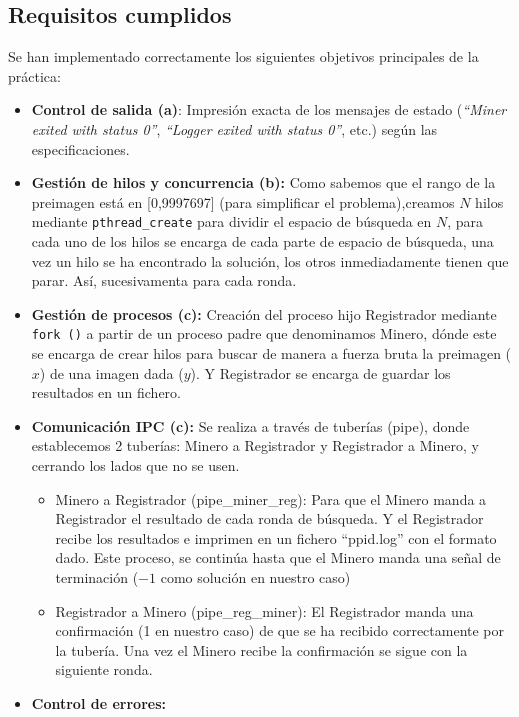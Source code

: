 \documentclass[12pt,a4paper]{article}
\begin{document}
\subsection{Requisitos cumplidos}
Se han implementado correctamente los siguientes objetivos principales de la práctica:
\begin{itemize}
    \item \textbf{Control de salida (a)}: Impresión exacta de los mensajes de estado (\textit{``Miner exited with status 0''}, \textit{``Logger exited with status 0''}, etc.) según las especificaciones.
    \item \textbf{Gestión de hilos y concurrencia (b):} Como sabemos que el rango de la preimagen está en [0,9997697] (para simplificar el problema),creamos $N$ hilos mediante \texttt{pthread\_create} para dividir el espacio de búsqueda en $N$, para cada uno de los hilos se encarga de cada parte de espacio de búsqueda, una vez un hilo se ha encontrado la solución, los otros inmediadamente tienen que parar. Así, sucesivamenta para cada ronda.
    \item \textbf{Gestión de procesos (c):} Creación del proceso hijo Registrador mediante \texttt{fork ()} a partir de un proceso padre que denominamos Minero, dónde este se encarga de crear hilos para buscar de manera a fuerza bruta la preimagen ($x$) de una imagen dada ($y$). Y Registrador se encarga de guardar los resultados en un fichero.
    \item \textbf{Comunicación IPC (c):} Se realiza a través de tuberías (pipe), donde establecemos 2 tuberías: Minero a Registrador y Registrador a Minero, y cerrando los lados que no se usen.
    \begin{itemize} 
        \item Minero a Registrador (pipe\_miner\_reg): Para que el Minero manda a Registrador el resultado de cada ronda de búsqueda. Y el Registrador recibe los resultados e imprimen en un fichero ``ppid.log'' con el formato dado. Este proceso, se continúa hasta que el Minero manda una señal de terminación ($-1$ como solución en nuestro caso)
        \item Registrador a Minero (pipe\_reg\_miner): El Registrador manda una confirmación (1 en nuestro caso) de que se ha recibido correctamente por la tubería. Una vez el Minero recibe la confirmación se sigue con la siguiente ronda.
    \end{itemize}
    \item \textbf{Control de errores:}
    \begin{itemize}

\end{itemize}
\end{itemize}
\end{document}
